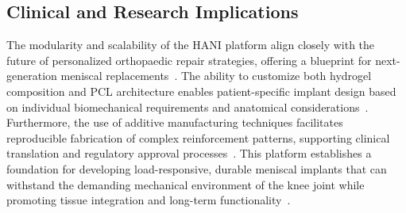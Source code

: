 \subsection{Clinical and Research Implications}

The modularity and scalability of the HANI platform align closely with the future of personalized orthopaedic repair strategies, offering a blueprint for next-generation meniscal replacements~\cite{filardo2019patientspecificmeniscus, gupta2020meniscaltissue}. The ability to customize both hydrogel composition and PCL architecture enables patient-specific implant design based on individual biomechanical requirements and anatomical considerations~\cite{makris2011kneemeniscus}. Furthermore, the use of additive manufacturing techniques facilitates reproducible fabrication of complex reinforcement patterns, supporting clinical translation and regulatory approval processes~\cite{elkommos2025hybridhydrogels}. This platform establishes a foundation for developing load-responsive, durable meniscal implants that can withstand the demanding mechanical environment of the knee joint while promoting tissue integration and long-term functionality~\cite{bulle2021humanmeniscus}.

